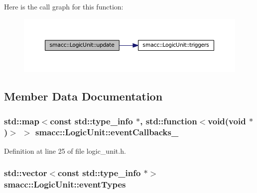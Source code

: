 Here is the call graph for this function\+:
\nopagebreak
\begin{figure}[H]
\begin{center}
\leavevmode
\includegraphics[width=350pt]{classsmacc_1_1LogicUnit_afcec0608a17e039791403472a2411539_cgraph}
\end{center}
\end{figure}




\subsection{Member Data Documentation}
\subsubsection[{\texorpdfstring{event\+Callbacks\+\_\+}{eventCallbacks_}}]{\setlength{\rightskip}{0pt plus 5cm}std\+::map$<$const std\+::type\+\_\+info $\ast$, std\+::function$<$void(void $\ast$)$>$ $>$ smacc\+::\+Logic\+Unit\+::event\+Callbacks\+\_\+}\hypertarget{classsmacc_1_1LogicUnit_a29196899a02ed436e9ba68784b4d5cf4}{}\label{classsmacc_1_1LogicUnit_a29196899a02ed436e9ba68784b4d5cf4}


Definition at line 25 of file logic\+\_\+unit.\+h.

\subsubsection[{\texorpdfstring{event\+Types}{eventTypes}}]{\setlength{\rightskip}{0pt plus 5cm}std\+::vector$<$const std\+::type\+\_\+info $\ast$$>$ smacc\+::\+Logic\+Unit\+::event\+Types}\hypertarget{classsmacc_1_1LogicUnit_a6f02a49da9b408b54a2755c18c5616a8}{}\label{classsmacc_1_1LogicUnit_a6f02a49da9b408b54a2755c18c5616a8}


